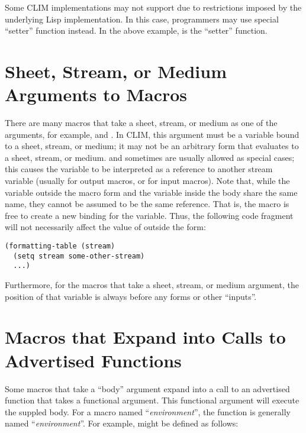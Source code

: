 Some CLIM implementations may not support  due to restrictions imposed
by the underlying Lisp implementation.  In this case, programmers may use
special ``setter'' function instead.  In the above example,
 is the ``setter'' function.


\section {Sheet, Stream, or Medium Arguments to Macros}

There are many macros that take a sheet, stream, or medium as one of the
arguments, for example,  and .
In CLIM, this argument must be a variable bound to a sheet, stream, or medium;
it may not be an arbitrary form that evaluates to a sheet, stream, or medium.
 and sometimes  are usually allowed as special cases; this causes
the variable to be interpreted as a reference to another stream variable
(usually  for output macros, or  for
input macros).  Note that, while the variable outside the macro form and the
variable inside the body share the same name, they cannot be assumed to be the
same reference.  That is, the macro is free to create a new binding for the
variable.  Thus, the following code fragment will not necessarily affect the
value of  outside the  form:

\begin{verbatim}
(formatting-table (stream)
  (setq stream some-other-stream)
  ...)
\end{verbatim}

Furthermore, for the macros that take a sheet, stream, or medium argument, the
position of that variable is always before any forms or other ``inputs''.


\section {Macros that Expand into Calls to Advertised Functions}

Some macros that take a ``body'' argument expand into a call to an advertised
function that takes a functional argument.  This functional argument will
execute the suppled body.  For a macro named ``{\it {}environment}'',
the function is generally named ``{\it {}environment}''.  For
example,  might be defined as follows:

